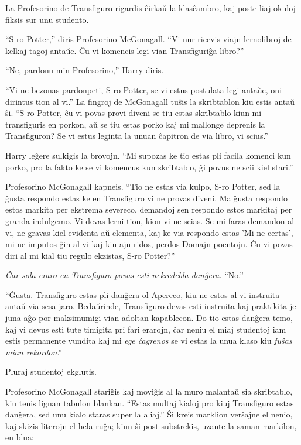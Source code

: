 La Profesorino de Transfiguro rigardis ĉirkaŭ la klasĉambro, kaj
poste liaj okuloj fiksis sur unu studento.

``S-ro Potter,'' diris Profesorino McGonagall. ``Vi nur ricevis viajn
lernolibroj de kelkaj tagoj antaŭe. Ĉu vi komencis legi vian
Transfiguriĝa libro?''

``Ne, pardonu min Profesorino,'' Harry diris.

``Vi ne bezonas pardonpeti, S-ro Potter, se vi estus postulata legi
antaŭe, oni dirintus tion al vi.'' La fingroj de McGonagall tuŝis la
skribtablon kiu estis antaŭ ŝi. ``S-ro Potter, ĉu vi povas provi
diveni se tiu estas skribtablo kiun mi transfiguris en porkon, aŭ se
tiu estas porko kaj mi mallonge deprenis la Transfiguron? Se vi
estus leginta la unuan ĉapitron de via libro, vi scius.''

Harry leĝere sulkigis la brovojn. ``Mi supozas ke tio estas pli facila
komenci kun porko, pro la fakto ke se vi komencus kun skribtablo, ĝi
povus ne scii kiel stari.''

Profesorino McGonagall kapneis. ``Tio ne estas via kulpo, S-ro Potter,
sed la ĝusta respondo estas ke en Transfiguro vi ne provas
diveni. Malĝusta respondo estos markita per ekstrema severeco,
demandoj sen respondo estos markitaj per granda indulgemo. Vi devas
lerni tion, kion vi ne scias. Se mi faras demandon al vi, ne gravas
kiel evidenta aŭ elementa, kaj ke via respondo estas 'Mi ne certas',
mi ne imputos ĝin al vi kaj kiu ajn ridos, perdos Domajn poentojn. Ĉu
vi povas diri al mi kial tiu regulo ekzistas, S-ro Potter?''

\emph{Ĉar sola eraro en Transfiguro povas esti nekredebla danĝera.}
``No.''

``Ĝusta. Transfiguro estas pli danĝera ol Apereco, kiu ne estos al
vi instruita antaŭ via sesa jaro. Bedaŭrinde, Transfiguro devas esti
instruita kaj praktikita je juna aĝo por maksimumigi vian adoltan
kapablecon. Do tio estas danĝera temo, kaj vi devus esti tute timigita
pri fari erarojn, ĉar neniu el miaj studentoj iam estis permanente
vundita kaj mi \emph{ege ĉagrenos} se vi estas la unua klaso kiu
\emph{fuŝas mian rekordon}.''

Pluraj studentoj ekglutis.

Profesorino McGonagall stariĝis kaj moviĝis al la muro malantaŭ sia
skribtablo, kiu tenis lignan tabulon blankan. ``Estas multaj kialoj
pro kiuj Transfiguro estas danĝera, sed unu kialo staras super la
aliaj.'' Ŝi kreis marklion verŝajne el nenio, kaj skizis literojn el
hela ruĝa; kiun ŝi post substrekis, uzante la saman markilon, en blua:

